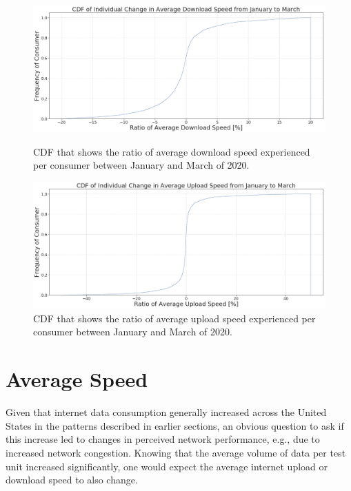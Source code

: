 \documentclass[conference,10pt]{IEEEtran}
\begin{document}
\begin{figure}[t]
  \begin{minipage}[t]{0.496\linewidth}
    \centering
    \includegraphics[width=0.98\linewidth]{figs/downspeed.PNG}
    \caption{CDF that shows the ratio of average download speed experienced per consumer between January and March of 2020.}
    \label{fig:downloadspeed2020}
  \end{minipage}
  \begin{minipage}[t]{0.496\linewidth}
    \centering
    \includegraphics[width=0.98\linewidth]{figs/uploadspeed.PNG}
    \caption{CDF that shows the ratio of average upload speed experienced per consumer between January and March of 2020.}
    \label{fig:uploadspeed2020}
  \end{minipage}
\end{figure}

\section{Average Speed}
\label{sec:average-speed}

Given that internet data consumption generally increased across the United States in the patterns described in earlier sections, an obvious question to ask if this increase led to changes in perceived network performance, e.g., due to increased network congestion. Knowing that the average volume of data per test unit increased significantly, one would expect the average internet upload or download speed to also change.
\end{document}
